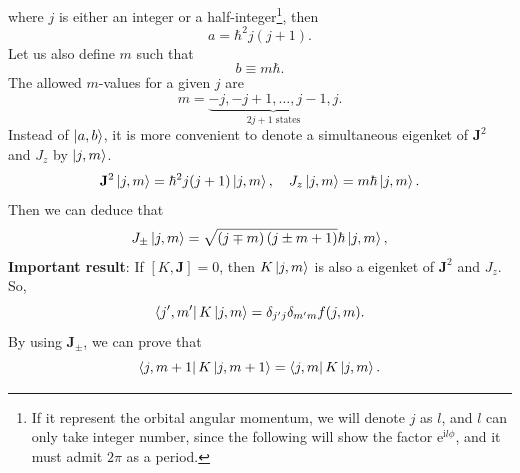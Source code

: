 \documentclass{article}
\theoremstyle{1}
\newcommand{\ii}{\mathrm{i}}
\newcommand{\ee}{\mathrm{e}}
\begin{document}
where $j$ is either an integer or a half-integer\footnote{If it represent the orbital angular momentum, we will denote $j$ as $l$, and $l$ can only take integer number, since the following will show the factor $\ee^{\ii l\phi}$, and it must admit $2\pi$ as a period.}, then 
\begin{equation}
    a=\hbar^2 j(j+1).
\end{equation}
Let us also define $m$ such that 
\begin{equation}
    b\equiv m\hbar.
\end{equation}
The allowed $m$-values for a given $j$ are
\begin{equation}
    m=\underset{2j+1 \text{ states}}{\underbrace{-j,-j+1,\dots,j-1,j}}.
\end{equation}
Instead of $\ket{a,b}$, it is more convenient to denote a simultaneous eigenket of $\mathbf{J}^2$
and $J_z$ by $\ket{j,m}$.
\begin{equation}\label{13.34}
    \mathbf{J}^2\ket{j,m}=\hbar^2 j(j+1)\ket{j,m},\quad J_z\ket{j,m}=m\hbar\ket{j,m}.
\end{equation}
Then we can deduce that 
\begin{equation}
    J_\pm\ket{j,m}=\sqrt{\left(j\mp m\right)\left(j\pm m+1\right)}\hbar\ket{j,m},
\end{equation}
\textbf{Important result}: If $[K,\mathbf{J}]=0$, then $K\ket{j,m}$ is also a eigenket of $\mathbf{J}^2$ and $J_z$. So,
\begin{equation}
    \bra{j',m'}K\ket{j,m}=\delta_{j'j}\delta_{m'm}f(j,m).
\end{equation}
By using $\mathbf{J}_{\pm}$, we can prove that 
\begin{equation}
    \bra{j,m+1}K\ket{j,m+1}=\bra{j,m}K\ket{j,m}.
\end{equation}
\end{document}
